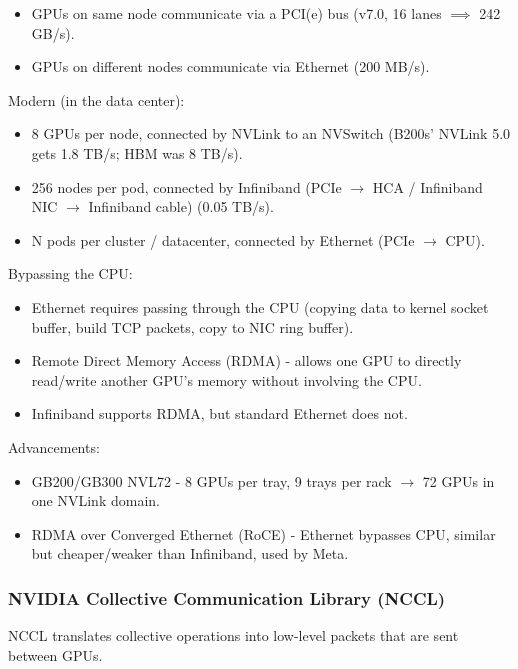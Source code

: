 \documentclass[12pt,twoside]{article}
\begin{document}
\begin{itemize}
    \item GPUs on same node communicate via a PCI(e) bus (v7.0, 16 lanes \(\implies\) 242 GB/s).
    \item GPUs on different nodes communicate via Ethernet (200 MB/s).
\end{itemize}

Modern (in the data center):

\begin{itemize}
    \item 8 GPUs per node, connected by NVLink to an NVSwitch (B200s' NVLink 5.0 gets 1.8 TB/s; HBM was 8 TB/s).
    \item 256 nodes per pod, connected by Infiniband (PCIe \(\to\) HCA / Infiniband NIC \(\to\) Infiniband cable) (0.05 TB/s).
    \item N pods per cluster / datacenter, connected by Ethernet (PCIe \(\to\) CPU).
\end{itemize}

Bypassing the CPU:

\begin{itemize}
    \item Ethernet requires passing through the CPU (copying data to kernel socket buffer, build TCP packets, copy to NIC ring buffer).
    \item Remote Direct Memory Access (RDMA) - allows one GPU to directly read/write another GPU's memory without involving the CPU.
    \item Infiniband supports RDMA, but standard Ethernet does not.
\end{itemize}

Advancements:

\begin{itemize}
    \item GB200/GB300 NVL72 - 8 GPUs per tray, 9 trays per rack \(\to\) 72 GPUs in one NVLink domain.
    \item RDMA over Converged Ethernet (RoCE) - Ethernet bypasses CPU, similar but cheaper/weaker than Infiniband, used by Meta.
\end{itemize}

\subsubsection*{NVIDIA Collective Communication Library (NCCL)}

NCCL translates collective operations into low-level packets that are sent between GPUs.
\end{document}
